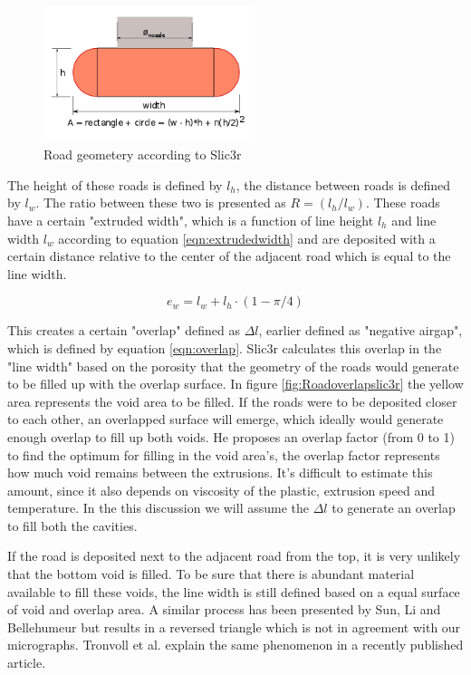 \begin{figure}[htb]
   \centering
    \includegraphics[width=0.55\textwidth]{chapter_2/figures/Slic3rshape.png}
    \caption{Road geometery according to Slic3r \cite{GaryHodgsonSlic3rMath}}
    \label{fig:Slic3rshape}
\end{figure}

The height of these roads is defined by $l_h$, the distance between roads is defined by $l_w$. The ratio between these two is presented as $R=(l_h/l_w)$.
These roads have a certain "extruded width", which is a function of line height $l_h$ and line width $l_w$ according to equation \ref{eqn:extrudedwidth} and are deposited with a certain distance relative to the center of the adjacent road which is equal to the line width. 

\begin{equation} \label{eqn:extrudedwidth}
e_w=l_w+l_h\cdot(1-\pi/4)
\end{equation}

This creates a certain "overlap" defined as $\Delta l$, earlier defined as "negative airgap", which is defined by equation \ref{eqn:overlap}. Slic3r calculates this overlap in the "line width" based on the porosity that the geometry of the roads would generate to be filled up with the overlap surface. In figure \ref{fig:Roadoverlapslic3r} the yellow area represents the void area to be filled. If the roads were to be deposited closer to each other, an overlapped surface will emerge, which ideally would generate enough overlap to fill up both voids. He  proposes an overlap factor (from 0 to 1) to find the optimum for filling in the void area's, the overlap factor represents how much void remains between the extrusions. It's difficult to estimate this amount, since it also depends on viscosity of the plastic, extrusion speed and temperature. In the this discussion we will assume the $\Delta l$ to generate an overlap to fill both the cavities.
 
If the road is deposited next to the adjacent road from the top, it is very unlikely that the bottom void is filled. To be sure that there is abundant material available to fill these voids, the line width is still defined based on a equal surface of void and overlap area. A similar process has been presented by Sun, Li and Bellehumeur \cite{Li2002CompositeProperties} but results in a reversed triangle which is not in agreement with our micrographs. Tronvoll et al. \cite{TronvollTheApproach} explain the same phenomenon in a recently published article.



